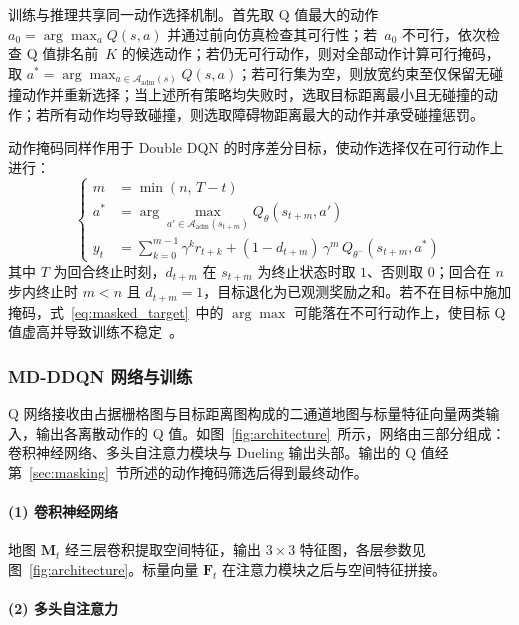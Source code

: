 \documentclass{iopjournal}
\begin{document}
训练与推理共享同一动作选择机制。首先取 Q 值最大的动作 $a_0 = \arg\max_a Q(s,a)$ 并通过前向仿真检查其可行性；若~$a_0$ 不可行，依次检查 Q 值排名前~$K$ 的候选动作；若仍无可行动作，则对全部动作计算可行掩码，取 $a^{*} = \arg\max_{a \in \mathcal{A}_{\mathrm{adm}}(s)} Q(s,a)$；若可行集为空，则放宽约束至仅保留无碰撞动作并重新选择；当上述所有策略均失败时，选取目标距离最小且无碰撞的动作；若所有动作均导致碰撞，则选取障碍物距离最大的动作并承受碰撞惩罚。

动作掩码同样作用于 Double DQN 的时序差分目标，使动作选择仅在可行动作上进行：
\begin{equation}\label{eq:masked_target}
  \left\{
  \begin{aligned}
    m &= \min(n,\, T - t) \\
    a^{*} &= \arg\max_{a'\in\mathcal{A}_{\mathrm{adm}}(s_{t+m})}Q_{\theta}(s_{t+m},a') \\
    y_t &= \sum_{k=0}^{m-1}\gamma^{k}r_{t+k}
           + (1 - d_{t+m})\,\gamma^{m}\,Q_{\theta^{-}}\!(s_{t+m},a^{*})
  \end{aligned}
  \right.
\end{equation}
其中 $T$ 为回合终止时刻，$d_{t+m}$ 在 $s_{t+m}$ 为终止状态时取 $1$、否则取 $0$；回合在 $n$ 步内终止时 $m < n$ 且 $d_{t+m}=1$，目标退化为已观测奖励之和。若不在目标中施加掩码，式~\eqref{eq:masked_target}~中的 $\arg\max$ 可能落在不可行动作上，使目标 Q 值虚高并导致训练不稳定~\cite{van2016deep}。

\subsubsection{MD-DDQN 网络与训练}\label{sec:network}

Q 网络接收由占据栅格图与目标距离图构成的二通道地图与标量特征向量两类输入，输出各离散动作的 Q 值。如图~\ref{fig:architecture}~所示，网络由三部分组成：卷积神经网络、多头自注意力模块与 Dueling 输出头部。输出的 Q 值经第~\ref{sec:masking}~节所述的动作掩码筛选后得到最终动作。



\paragraph{(1) 卷积神经网络}

地图 $\mathbf{M}_t$ 经三层卷积提取空间特征，输出 $3\times3$ 特征图，各层参数见图~\ref{fig:architecture}。标量向量 $\mathbf{F}_t$ 在注意力模块之后与空间特征拼接。

\paragraph{(2) 多头自注意力}\label{sec:mha}
\end{document}
